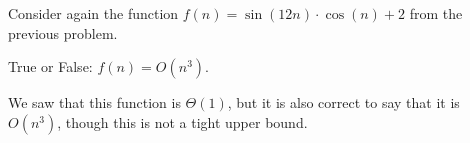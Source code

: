 \begin{prob}
    Consider again the function $f(n) = \sin(12n) \cdot \cos(n) + 2$ from the previous
    problem.

    True or False: $f(n) = O(n^3)$.

    \Tf{}

    \begin{soln}
        We saw that this function is $\Theta(1)$, but it is also correct to say
        that it is $O(n^3)$, though this is not a tight upper bound.
    \end{soln}

\end{prob}
